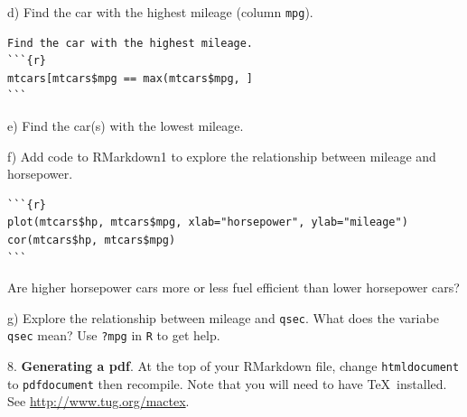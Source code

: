 \documentclass[10pt]{article}
\newcommand{\U}{\underline{\hspace{5pt}}}
\begin{document}
\hspace{10pt} d) Find the car with the highest
mileage (column \texttt{mpg}).\vspace{-10pt}
\begin{verbatim}
Find the car with the highest mileage.
```{r}
mtcars[mtcars$mpg == max(mtcars$mpg, ]
```
\end{verbatim}

\hspace{10pt} e) Find the car(s) with the lowest mileage.
\medskip

\hspace{10pt} f) Add code to RMarkdown1 to explore the relationship between
mileage and horsepower.\vspace{-10pt}
\begin{verbatim}
```{r}
plot(mtcars$hp, mtcars$mpg, xlab="horsepower", ylab="mileage")
cor(mtcars$hp, mtcars$mpg)
```
\end{verbatim}
Are higher horsepower cars more or less fuel efficient than lower horsepower cars?

\hspace{10pt} g) Explore the relationship between mileage and \texttt{qsec}.
What does the variabe \texttt{qsec} mean?  Use \texttt{?mpg} in \texttt{R}
to get help.
\medskip
\bigskip


8. \textbf{Generating a pdf}. At the top of your RMarkdown file, change
\texttt{html\U document} to \texttt{pdf\U document} then recompile.
Note that you will need to have \TeX\ installed. See
\href{http://www.tug.org/mactex}{http://www.tug.org/mactex}.
\vfill
\eject
\end{document}
